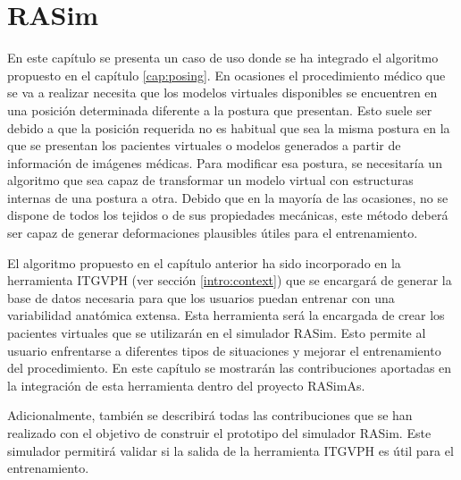 \chapter{RASim} 
\label{cap:rasim}


En este capítulo se presenta un caso de uso donde se ha integrado el algoritmo propuesto en el capítulo \ref{cap:posing}.
En ocasiones el procedimiento médico que se va a realizar necesita que los modelos virtuales disponibles se encuentren en una posición determinada diferente a la postura que presentan. Esto suele ser debido a que la posición requerida no es habitual que sea la misma postura en la que se presentan los pacientes virtuales o modelos generados a partir de información de imágenes médicas.
Para modificar esa postura, se necesitaría un algoritmo que sea capaz de transformar un modelo virtual con estructuras internas de una postura a otra. Debido que en la mayoría de las ocasiones, no se dispone de todos los tejidos o de sus propiedades mecánicas, este método deberá ser capaz de generar deformaciones plausibles útiles para el entrenamiento.

El algoritmo propuesto en el capítulo anterior ha sido incorporado en la herramienta \ac{ITGVPH} (ver sección \ref{intro:context}) que se encargará de generar la base de datos necesaria para que los usuarios puedan entrenar con una variabilidad anatómica extensa. Esta herramienta será la encargada de crear los pacientes virtuales que se utilizarán en el simulador \ac{RASim}. Esto permite al usuario enfrentarse a diferentes tipos de situaciones y mejorar el entrenamiento del procedimiento. En este capítulo se mostrarán las contribuciones aportadas en la integración de esta herramienta dentro del proyecto \ac{RASimAs}.



Adicionalmente, también se describirá todas las contribuciones que se han realizado con el objetivo de construir el prototipo del simulador \ac{RASim}. Este simulador permitirá validar si la salida de la herramienta \ac{ITGVPH} es útil para el entrenamiento.

